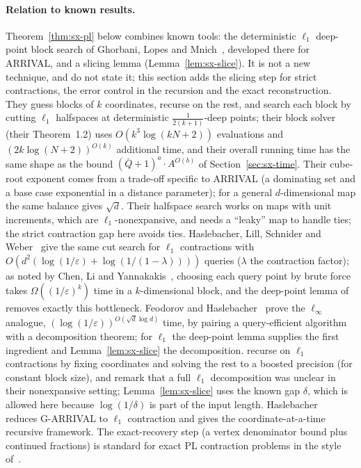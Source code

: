 \paragraph{Relation to known results.} Theorem~\ref{thm:sx-pl} below combines known tools: the deterministic $\ell_1$ deep-point block search of Ghorbani, Lopes and Mnich~\cite{glm26}, developed there for ARRIVAL, and a slicing lemma (Lemma~\ref{lem:sx-slice}). It is not a new technique, and \cite{glm26} do not state it; this section adds the slicing step for strict contractions, the error control in the recursion and the exact reconstruction. They guess blocks of $k$ coordinates, recurse on the rest, and search each block by cutting $\ell_1$ halfspaces
at deterministic $\frac1{2(k+1)}$-deep points; their block solver (their Theorem~1.2) uses
$O(k^3\log(kN+2))$ evaluations and $(2k\log(N+2))^{O(k)}$ additional time, and their overall running time
has the same shape as the bound $(\bar Q+1)^a\cdot A^{O(b)}$ of Section~\ref{sec:sx-time}. Their
cube-root exponent comes from a trade-off specific to ARRIVAL (a dominating set and a base case exponential in a distance parameter);
for a general $d$-dimensional map the same balance gives $\sqrt d$. Their halfspace search works on maps
with unit increments, which are $\ell_1$-nonexpansive, and needs a ``leaky'' map to handle ties; the
strict contraction gap here avoids ties. Haslebacher, Lill, Schnider and Weber~\cite{hlsw25} give the same
cut search for $\ell_1$ contractions with $O(d^2(\log(1/\varepsilon)+\log(1/(1-\lambda))))$ queries
($\lambda$ the contraction factor); as noted by Chen, Li and Yannakakis~\cite{cly26}, choosing each query
point by brute force takes $\Omega((1/\varepsilon)^k)$ time in a $k$-dimensional block, and the
deep-point lemma of~\cite{glm26} removes exactly this bottleneck. Feodorov and Haslebacher~\cite{fh26}
prove the $\ell_\infty$ analogue, $(\log(1/\varepsilon))^{O(\sqrt d\log d)}$ time, by pairing a
query-efficient algorithm with a decomposition theorem; for $\ell_1$ the deep-point lemma supplies the
first ingredient and Lemma~\ref{lem:sx-slice} the decomposition. \cite{cly26} recurse on $\ell_1$
contractions by fixing coordinates and solving the rest to a boosted precision (for constant block size),
and remark that a full $\ell_1$ decomposition was unclear in their nonexpansive setting;
Lemma~\ref{lem:sx-slice} uses the known gap $\delta$, which is allowed here because $\log(1/\delta)$ is
part of the input length. Haslebacher~\cite{haslebacher25} reduces G-ARRIVAL to $\ell_1$ contraction and
gives the coordinate-at-a-time recursive framework. The exact-recovery step (a vertex denominator bound
plus continued fractions) is standard for exact PL contraction problems in the style of~\cite{fgms18}.

